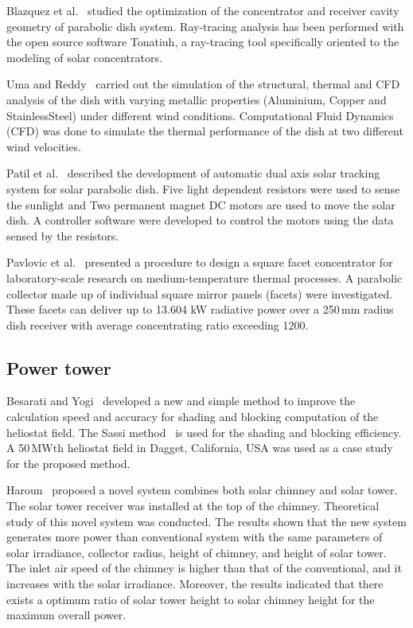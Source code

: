 Blazquez et al.~\cite{Blazquez2016} studied the optimization of the concentrator and receiver cavity geometry of parabolic dish system. Ray-tracing analysis has been performed with the open source software Tonatiuh, a ray-tracing tool specifically oriented to the modeling of solar concentrators.

Uma and Reddy~\cite{Uma2015} carried out the simulation of the structural, thermal and CFD analysis of the dish with varying metallic properties (Aluminium, Copper and StainlessSteel) under different wind conditions. Computational Fluid Dynamics (CFD) was done to simulate the thermal performance of the dish at two different wind velocities.

Patil et al.~\cite{Patil2016} described the development of automatic dual axis solar tracking system for solar parabolic dish. Five light dependent resistors were used to sense the sunlight and Two permanent magnet DC motors are used to move the solar dish. A controller software were developed to control the motors using the data sensed by the resistors.

Pavlovic et al.~\cite{Pavlovic2014} presented a procedure to design a square facet concentrator for laboratory-scale research on medium-temperature thermal processes. A parabolic collector made up of individual square mirror panels (facets) were investigated. These facets can deliver up to 13.604 kW radiative power over a 250$\,\mathrm{mm}$ radius dish receiver with average concentrating ratio exceeding 1200.

\subsection{Power tower}\label{sec:st}

Besarati and Yogi~\cite{Besarati2014} developed a new and simple method to improve the calculation speed and accuracy for shading and blocking computation of the heliostat field. The Sassi method~\cite{Sassi1983} is used for the shading and blocking efficiency. A 50$\,\mathrm{MWth}$ heliostat field in Dagget, California, USA was used as a case study for the proposed method.

Haroun~\cite{El2015} proposed a novel system combines both solar chimney and solar tower. The solar tower receiver was installed at the top of the chimney. Theoretical study of this novel system was conducted. The results shown that the new system generates more power than conventional system with the same parameters of solar irradiance, collector radius, height of chimney, and height of solar tower. The inlet air speed of the chimney is higher than that of the conventional, and it increases with the solar irradiance. Moreover, the results indicated that there exists a optimum ratio of solar tower height to solar chimney height for the maximum overall power.

